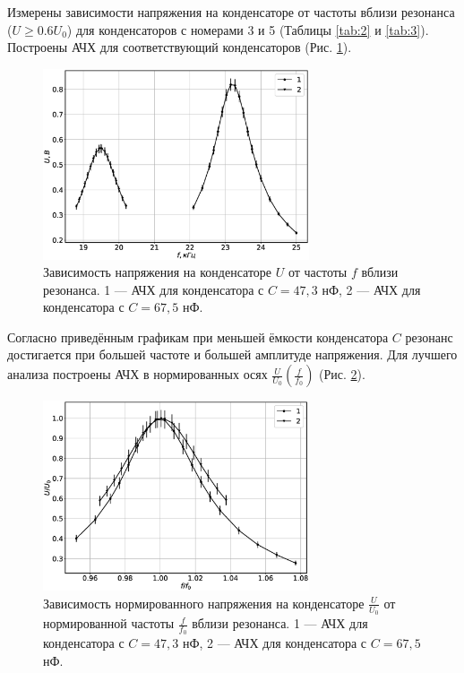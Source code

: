\documentclass[12pt]{article}
\begin{document}
Измерены зависимости напряжения на конденсаторе от частоты вблизи резонанса ($U \geq 0.6 U_0$) для конденсаторов
с номерами 3 и 5 (Таблицы \ref{tab:2} и \ref{tab:3}). Построены АЧХ для соответствующий конденсаторов (Рис. \ref{fig:Uf}).

\begin{figure}
    \centering
    \includegraphics[width=0.7\textwidth]{Uf.eps}
    \caption{Зависимость напряжения на конденсаторе $U$ от частоты $f$ вблизи резонанса. 1 --- АЧХ для конденсатора
        с $C = 47,3$ нФ, 2 --- АЧХ для конденсатора с $C = 67,5$ нФ.}
    \label{fig:Uf}
\end{figure}

Согласно приведённым графикам при меньшей ёмкости конденсатора $C$ резонанс достигается при большей частоте и большей амплитуде напряжения.
Для лучшего анализа построены АЧХ в нормированных осях $\frac{U}{U_0}\left( \frac{f}{f_0} \right) $ (Рис. \ref{fig:Uf_norm}).

\begin{figure}
    \centering
    \includegraphics[width=0.7\textwidth]{Uf_norm.eps}
    \caption{Зависимость нормированного напряжения на конденсаторе $\frac{U}{U_0}$ от нормированной частоты $\frac{f}{f_0}$ вблизи резонанса.
        1 --- АЧХ для конденсатора с $C = 47,3$ нФ, 2 --- АЧХ для конденсатора с $C = 67,5$ нФ.}
    \label{fig:Uf_norm}
\end{figure}
\end{document}
